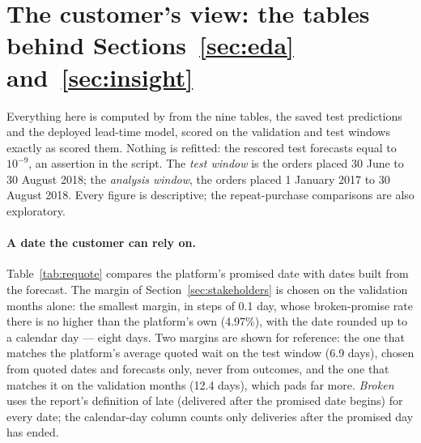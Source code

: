 \section{\texorpdfstring{The customer's view: the tables behind Sections~\ref{sec:eda} and~\ref{sec:insight}}{The customer's view: the tables behind Sections 4 and 9}}
\label{app:customer}

Everything here is computed by  from the nine tables,
the saved test predictions and the deployed lead-time model, scored on the
validation and test windows exactly as  scored them.
Nothing is refitted: the rescored test forecasts equal
 to $10^{-9}$, an assertion in the script. The
\emph{test window} is the orders placed 30 June to 30 August 2018; the
\emph{analysis window}, the orders placed 1 January 2017 to 30 August 2018. Every
figure is descriptive; the repeat-purchase comparisons are also exploratory.

\paragraph{A date the customer can rely on.} Table~\ref{tab:requote} compares
the platform's promised date with dates built from the forecast. The margin of
Section~\ref{sec:stakeholders} is chosen on the validation months alone: the
smallest margin, in steps of 0.1 day, whose broken-promise rate there is no
higher than the platform's own (4.97\%), with the date rounded up to a calendar
day --- eight days. Two margins are shown for reference: the one that matches the
platform's average quoted wait on the test window (6.9 days), chosen from quoted
dates and forecasts only, never from outcomes, and the one that matches it on the
validation months (12.4 days), which pads far more. \emph{Broken} uses the
report's definition of late (delivered after the promised date begins) for every
date; the calendar-day column counts only deliveries after the promised day has
ended.

